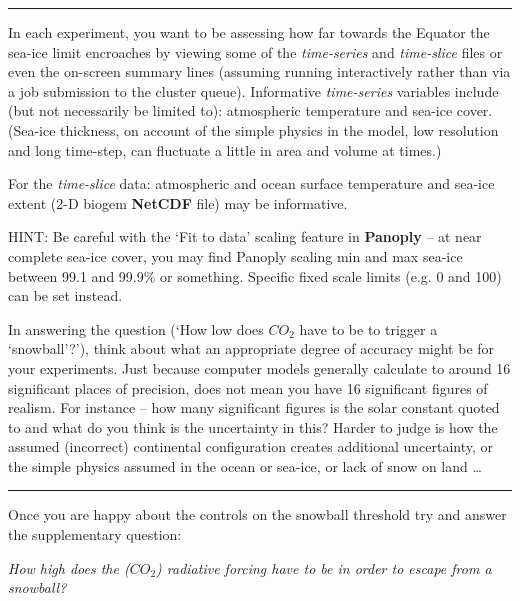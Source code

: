 \documentclass[11pt,fleqn]{book} %
\begin{document}
\vspace{1mm}
\noindent\rule{4cm}{0.5pt}
\vspace{2mm}

\noindent In each experiment, you want to be assessing how far towards the Equator the sea-ice limit encroaches by viewing some of the \textit{time-series} and \textit{time-slice} files or even the on-screen summary lines (assuming running interactively rather than via a job submission to the cluster queue). Informative \textit{time-series} variables include (but not necessarily be limited to): atmospheric temperature and sea-ice cover. (Sea-ice thickness, on account of the simple physics in the model, low resolution and long time-step, can fluctuate a little in area and volume at times.)

For the \textit{time-slice} data: atmospheric and ocean surface temperature and sea-ice extent (2-D biogem \textbf{NetCDF} file) may be informative.

HINT: Be careful with the ‘\textsf{Fit to data}’ scaling feature in \textbf{Panoply} – at near complete sea-ice cover, you may find Panoply scaling min and max sea-ice between 99.1 and 99.9\% or something. Specific fixed scale limits (e.g. 0 and 100) can be set instead.

In answering the question (‘How low does \(CO_{2}\) have to be to trigger a ‘snowball’?’), think about what an appropriate degree of accuracy might be for your experiments. Just because computer models generally calculate to around 16 significant places of precision, does not mean you have 16 significant figures of realism. For instance – how many significant figures is the solar constant quoted to and what do you think is the uncertainty in this? Harder to judge is how the assumed (incorrect) continental configuration creates additional uncertainty, or the simple physics assumed in the ocean or sea-ice, or lack of snow on land …

\vspace{1mm}
\noindent\rule{4cm}{0.5pt}
\vspace{2mm}

\noindent Once you are happy about the controls on the snowball threshold try and answer the supplementary question:

\vspace{2mm}
\noindent \textit{How high does the (\(CO_{2}\)) radiative forcing have to be in order to escape from a snowball?}
\vspace{2mm}
\end{document}

